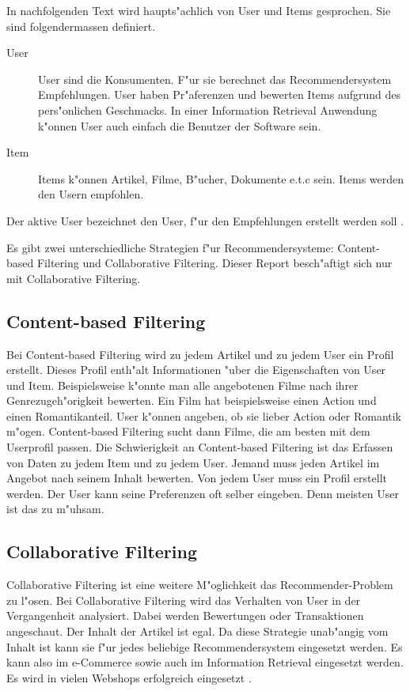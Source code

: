 \documentclass[a4paper, 12pt]{article}
\begin{document}
In nachfolgenden Text wird haupts"achlich von User und Items gesprochen. Sie sind folgendermassen definiert.

\begin{description}
\item[User] User sind die Konsumenten. F"ur sie berechnet das Recommendersystem Empfehlungen. 
User haben Pr"aferenzen und bewerten Items aufgrund des pers"onlichen Geschmacks. In einer Information Retrieval Anwendung k"onnen User auch einfach die Benutzer der Software sein.
\item[Item] 
Items k"onnen Artikel, Filme, B"ucher, Dokumente e.t.c sein. Items werden den Usern empfohlen.
\end{description}

Der aktive User bezeichnet den User, f"ur den Empfehlungen erstellt werden soll \cite{jannach11}.

Es gibt zwei unterschiedliche Strategien f"ur Recommendersysteme: Content-based Filtering und Collaborative Filtering. Dieser Report besch"aftigt sich nur mit Collaborative Filtering. 

\subsection{Content-based Filtering}
\label{sec:contentbased}

Bei Content-based Filtering wird zu jedem Artikel und zu jedem User ein Profil erstellt. Dieses Profil enth"alt Informationen "uber die Eigenschaften von User und Item. Beispielsweise k"onnte man alle angebotenen Filme nach ihrer Genrezugeh"origkeit bewerten. Ein Film hat beispielsweise einen Action und einen Romantikanteil. User k"onnen angeben, ob sie lieber Action oder Romantik m"ogen. Content-based Filtering sucht dann Filme, die am besten mit dem Userprofil passen. Die Schwierigkeit an Content-based Filtering ist das Erfassen von Daten zu jedem Item und zu jedem User. Jemand muss jeden Artikel im Angebot nach seinem Inhalt bewerten. Von jedem User muss ein Profil erstellt werden. Der User kann seine Preferenzen oft selber eingeben. Denn meisten User ist das zu m"uhsam.

\subsection{Collaborative Filtering}
\label{sec:collaborativefiltering}

Collaborative Filtering ist eine weitere M"oglichkeit das Re\-commender-Prob\-lem zu l"osen. Bei Collaborative Filtering wird das Verhalten von User in der Vergangenheit analysiert. Dabei werden Bewertungen oder Transaktionen angeschaut. Der Inhalt der Artikel ist egal. Da diese Strategie unab"angig vom Inhalt ist kann sie f"ur jedes beliebige Recommendersystem eingesetzt werden. Es kann also im e-Commerce sowie auch im Information Retrieval eingesetzt werden.  Es wird in vielen Webshops erfolgreich eingesetzt \cite{sarwar01}. 
\end{document}
